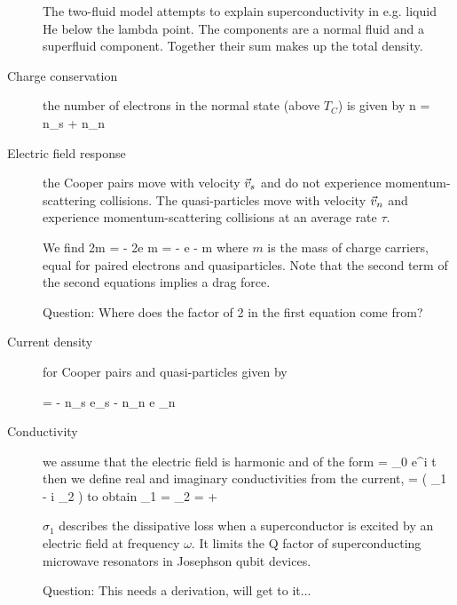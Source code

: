 \begin{description}
The two-fluid model attempts to explain superconductivity in e.g. liquid He below the lambda point. The components are a normal fluid and a superfluid component. Together their sum makes up the total density. 


\item[Charge conservation] the number of electrons in the normal state (above $T_C$) is given by 
\beq
n = n_s + n_n
\eeq


\item[Electric field response] the Cooper pairs move with velocity $\vec{v}_s$ and do not experience momentum-scattering collisions. The quasi-particles move with velocity $\vec{v}_n$ and experience momentum-scattering collisions at an average rate $\tau$. 

We find
\beq
2m  = - 2e 
\eeq
\beq
m = - e  - m 
\eeq
where $m$ is the mass of charge carriers, equal for paired electrons and quasiparticles. Note that the second term of the second equations implies a drag force. 

Question: Where does the factor of 2 in the first equation come from? 

\item[Current density ] for Cooper pairs and quasi-particles given by 

\beq
{} = - n_s e_s - n_n e _n
\eeq

\item[Conductivity] we assume that the electric field is harmonic and of the form 
\beq
{} = _0 e^{i \omega t}
\eeq
then we define real and imaginary conductivities from the current, 
\beq
{} = ( \sigma_1 - i \sigma_2 ) 
\eeq
to obtain
\beq
\sigma_1 = 
\eeq
\beq
\sigma_2 =  + 
\eeq

$\sigma_1$ describes the dissipative loss when a superconductor is excited by an electric field at frequency  $\omega$. It limits the Q factor of superconducting microwave resonators in Josephson qubit devices. 



Question: This needs a derivation, will get to it...



\end{description}

